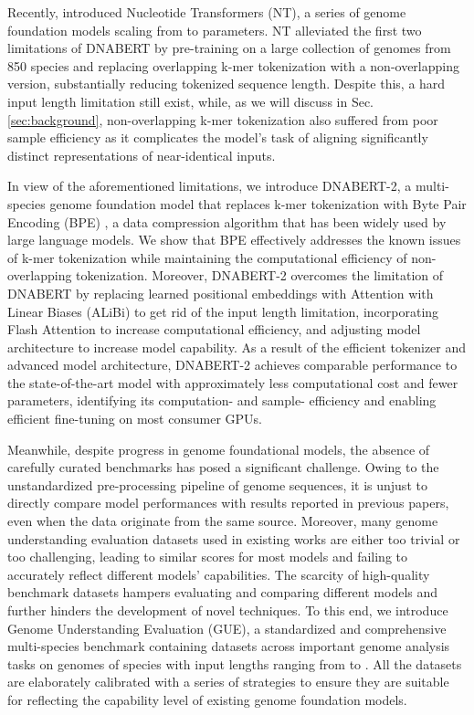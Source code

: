 \documentclass{article}
\begin{document}
Recently, \citet{nt} introduced Nucleotide Transformers (NT), a series of genome foundation models scaling from  to  parameters. NT alleviated the first two limitations of DNABERT by pre-training on a large collection of genomes from 850 species and replacing overlapping k-mer tokenization with a non-overlapping version, substantially reducing tokenized sequence length. Despite this, a hard input length limitation still exist, while, as we will discuss in Sec. \ref{sec:background}, non-overlapping k-mer tokenization also suffered from poor sample efficiency as it complicates the model's task of aligning significantly distinct representations of near-identical inputs.

In view of the aforementioned limitations, we introduce DNABERT-2, a multi-species genome foundation model that replaces k-mer tokenization with Byte Pair Encoding (BPE) \citep{bpe}, a data compression algorithm that has been widely used by large language models. We show that BPE effectively addresses the known issues of k-mer tokenization while maintaining the computational efficiency of non-overlapping tokenization.  Moreover, DNABERT-2 overcomes the limitation of DNABERT by replacing learned positional embeddings with Attention with Linear Biases (ALiBi) \citep{alibi} to get rid of the input length limitation, incorporating Flash Attention \citep{flashattention} to increase computational efficiency, and adjusting model architecture to increase model capability. 
As a result of the efficient tokenizer and advanced model architecture, DNABERT-2 achieves comparable performance to the state-of-the-art model with approximately  less computational cost and  fewer parameters, identifying its computation- and sample- efficiency and enabling efficient fine-tuning on most consumer GPUs.

Meanwhile, despite progress in genome foundational models, the absence of carefully curated benchmarks has posed a significant challenge. Owing to the unstandardized pre-processing pipeline of genome sequences, it is unjust to directly compare model performances with results reported in previous papers, even when the data originate from the same source. 
Moreover, many genome understanding evaluation datasets used in existing works \citep{nt} are either too trivial or too challenging, leading to similar scores for most models and failing to accurately reflect different models' capabilities. 
The scarcity of high-quality benchmark datasets hampers evaluating and comparing different models and further hinders the development of novel techniques.
To this end, we introduce Genome Understanding Evaluation (GUE), a standardized and comprehensive multi-species benchmark containing  datasets across  important genome analysis tasks on genomes of  species with input lengths ranging from  to . 
All the datasets are elaborately calibrated with a series of strategies to ensure they are suitable for reflecting the capability level of existing genome foundation models. 
\end{document}
